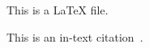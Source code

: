 \documentclass[12pt]{article}
\begin{document}
This is a LaTeX file.

This is an in-text citation~\cite{buttonbugs_general_2026}.



\end{document}
